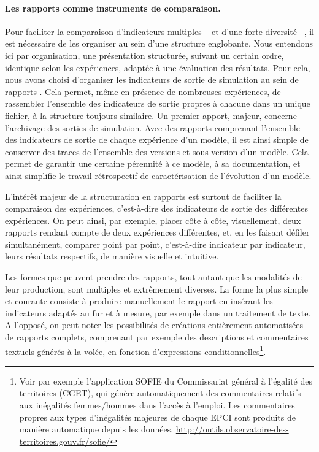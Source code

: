 \paragraph{Les rapports comme instruments de comparaison.}
Pour faciliter la comparaison d'indicateurs multiples -- et d'une forte diversité --, il est nécessaire de les organiser au sein d'une structure englobante.
Nous entendons ici par organisation, une présentation structurée, suivant un certain ordre, identique selon les expériences, adaptée à une évaluation des résultats.
Pour cela, nous avons choisi d'organiser les indicateurs de sortie de simulation au sein de \og rapports \fg{}.
Cela permet, même en présence de nombreuses expériences, de rassembler l'ensemble des indicateurs de sortie propres à chacune dans un unique fichier, à la structure toujours similaire.
Un premier apport, majeur, concerne l'archivage des sorties de simulation.
Avec des rapports comprenant l'ensemble des indicateurs de sortie de chaque expérience d'un modèle, il est ainsi simple de conserver des traces de l'ensemble des versions et sous-version d'un modèle.
Cela permet de garantir une certaine pérennité à ce modèle, à sa documentation, et ainsi simplifie le travail rétrospectif de caractérisation de l'évolution d'un modèle.	

L'intérêt majeur de la structuration en rapports est surtout de faciliter la comparaison des expériences, c'est-à-dire des indicateurs de sortie des différentes expériences.
On peut ainsi, par exemple, placer côte à côte, visuellement, deux rapports rendant compte de deux expériences différentes, et, en les faisant défiler simultanément, comparer point par point, c'est-à-dire indicateur par indicateur, leurs résultats respectifs, de manière visuelle et intuitive.

Les formes que peuvent prendre des rapports, tout autant que les modalités de leur production, sont multiples et extrêmement diverses.
La forme la plus simple et courante consiste à produire manuellement le rapport en insérant les indicateurs adaptés au fur et à mesure, par exemple dans un traitement de texte.
A l'opposé, on peut noter les possibilités de créations entièrement automatisées de rapports complets, comprenant par exemple des descriptions et commentaires textuels générés à la volée, en fonction d'expressions conditionnelles\footnote{
	Voir par exemple l'application \og SOFIE\fg{} du Commissariat général à l'égalité des territoires (CGET), qui génère automatiquement des commentaires relatifs aux inégalités femmes/hommes dans l'accès à l'emploi. Les commentaires propres aux types d'inégalités majeures de chaque EPCI sont produits de manière automatique depuis les données. \href{http://outils.observatoire-des-territoires.gouv.fr/sofie/}{http://outils.observatoire-des-territoires.gouv.fr/sofie/}
}.

